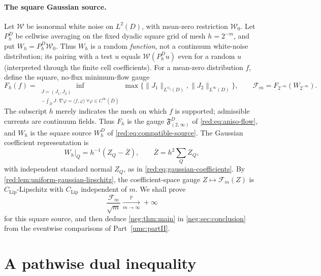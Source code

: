 \documentclass[11pt]{article}
\theoremstyle{definition}
\theoremstyle{remark}
\numberwithin{equation}{section}
\begin{document}
\paragraph{The square Gaussian source.}
Let $\mathcal W$ be isonormal white noise on $L^2(D)$,
with mean-zero restriction $\mathcal W_0$. Let $P_h^D$ be cellwise
averaging on the fixed dyadic square grid of mesh $h=2^{-m}$, and put
$W_h=P_h^D\mathcal W_0$. Thus $W_h$ is a random \emph{function},
not a continuum white-noise distribution; its pairing with a test
$u$ equals $\mathcal W(P_h^Du)$ even for a random $u$ (interpreted
through the finite cell coefficients).
For a mean-zero distribution $f$, define the square, no-flux
minimum-flow gauge
\begin{equation}\label{neg:eq:flow-gauge}
 F_h(f)=\inf_{\substack{J=(J_1,J_2)\\
             -\int_DJ\cdot\nabla\varphi=\langle f,\varphi\rangle\ \forall\varphi\in C^\infty(\overline D)}}
       \max\{\|J_1\|_{L^{\psi_2}(D)},\|J_2\|_{L^\infty(D)}\},
 \qquad \mathcal F_m=F_{2^{-m}}(W_{2^{-m}}).
\end{equation}
The subscript $h$ merely indicates the mesh on which $f$ is supported;
admissible currents are continuum fields. Thus $F_h$ is the gauge
$\mathfrak F_{(2,\infty)}^{D}$ of \eqref{red:eq:aniso-flow}, and $W_h$
is the square source $W_h^D$ of \eqref{red:eq:compatible-source}.
The Gaussian coefficient representation is
\begin{equation}\label{neg:eq:coefficients}
  W_h|_Q=h^{-1}(Z_Q-\overline Z),\qquad
  \overline Z=h^2\sum_Q Z_Q,
\end{equation}
with independent standard normal $Z_Q$, as in
\eqref{red:eq:gaussian-coefficients}. By
\cref{red:lem:uniform-gaussian-lipschitz}, the coefficient-space gauge
$Z\mapsto\mathcal F_m(Z)$ is $C_{\mathrm{Lip}}$-Lipschitz with
$C_{\mathrm{Lip}}$ independent of $m$. We shall prove
\begin{equation}\label{neg:eq:gaussian-negative}
  \frac{\mathcal F_m}{\sqrt m}
     \xrightarrow[m\to\infty]{\mathbb P}+\infty
\end{equation}
for this square source, and then deduce \cref{neg:thm:main} in
\cref{neg:sec:conclusion} from the eventwise comparisons of
Part~\ref{umc:partII}.

\section{A pathwise dual inequality}
\label{neg:sec:duality}
\end{document}
